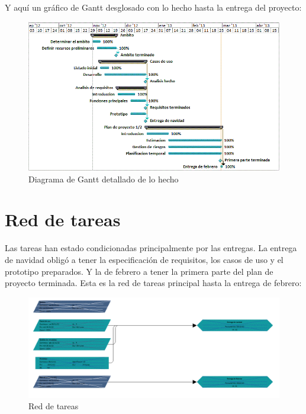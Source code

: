 \documentclass[spanish,a4paper,12pt]{report}	%
\begin{document}
	\newpage

	Y aquí un gráfico de Gantt desglosado con lo hecho hasta la entrega del proyecto:

	\begin{figure}[!h]
	\centering
	\includegraphics[scale=0.8]{GraficoGanttDetallado.png}
	\caption{Diagrama de Gantt detallado de lo hecho}
	\end{figure}

	\newpage

	\section{Red de tareas}

	Las tareas han estado condicionadas principalmente por las entregas. La entrega de navidad obligó a tener la especificación de requisitos,  los casos de uso y el prototipo preparados.
	 Y la de febrero a tener la primera parte del plan de proyecto terminada. Esta es la red de tareas principal hasta la entrega de febrero:

	\begin{figure}[!h]
	\centering
	\includegraphics[scale=0.56]{RedTareas.png}
	\caption{Red de tareas}
	\end{figure}
\end{document}
